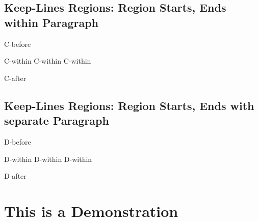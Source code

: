 \section{Keep-Lines Regions: Region Starts, Ends within Paragraph
}
\begin{multicols}{2}\end{multicols}C-before
\mktsShowpar\par
\begingroup\obeyalllines{}C-within
C-within
C-within

\endgroup{}C-after
\begin{multicols}{2}\end{multicols}
\section{Keep-Lines Regions: Region Starts, Ends with separate Paragraph
}
\begin{multicols}{2}\end{multicols}D-before\mktsShowpar\par
\begingroup\obeyalllines{}D-within
D-within
D-within

\endgroup{}D-after
\begin{multicols}{2}\end{multicols}
\chapter{This is a Demonstration 
}
\begin{multicols}{2}\end{multicols}
